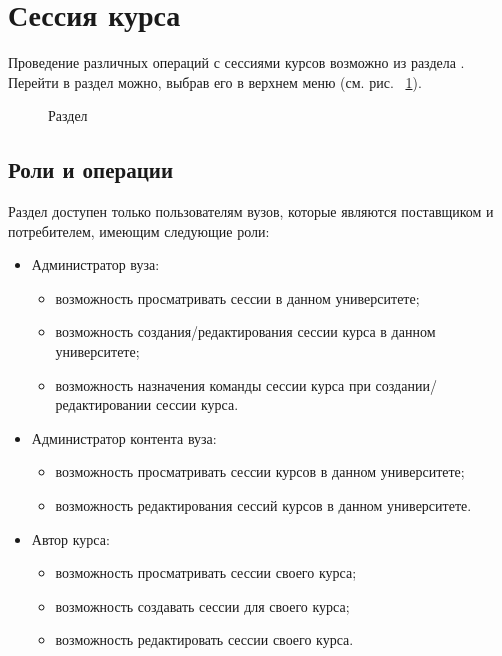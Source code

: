 \section{Сессия курса}
Проведение различных операций с сессиями курсов возможно из раздела . 
Перейти в раздел можно, выбрав его в верхнем меню (см. рис. ~\ref{img:course_session:top_menu}).

\begin{figure}[H]
	\caption{Раздел }
	\label{img:course_session:top_menu}
\end{figure}

\subsection{Роли и операции}
Раздел доступен только пользователям вузов, которые являются поставщиком и потребителем, имеющим следующие роли:

\begin{itemize}
	\item Администратор вуза:
	\begin{itemize}
		\item возможность просматривать сессии в данном университете;
		\item возможность создания/редактирования сессии курса в данном университете;
		\item возможность назначения команды сессии курса при создании/редактировании сессии курса.
	\end{itemize}
	\item Администратор контента вуза:
	\begin{itemize}
		\item возможность просматривать сессии курсов в данном университете;
		\item возможность редактирования сессий курсов в данном университете.
	\end{itemize}
	\item Автор курса:
	\begin{itemize}
		\item возможность просматривать сессии своего курса;
		\item возможность создавать сессии для своего курса;
		\item возможность редактировать сессии своего курса.
	\end{itemize}
\end{itemize}
